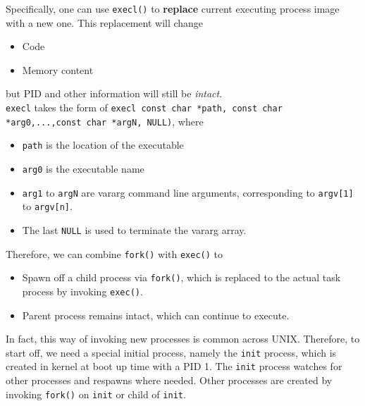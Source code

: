 \documentclass[12pt]{article}
\theoremstyle{definition}
\begin{document}
Specifically, one can use \texttt{execl()} to \textbf{replace} current executing process image with a new one. This replacement will change 
\begin{itemize}
  \item Code
  \item Memory content
\end{itemize}
but PID and other information will still be \textit{intact}.\\
\texttt{execl} takes the form of \texttt{execl const char *path, const char *arg0,...,const char *argN, NULL)}, where
\begin{itemize}
  \item \texttt{path} is the location of the executable
  \item \texttt{arg0} is the executable name
  \item \texttt{arg1} to \texttt{argN} are vararg command line arguments, corresponding to \texttt{argv[1]} to \texttt{argv[n]}.
  \item The last \texttt{NULL} is used to terminate the vararg array.
\end{itemize}
Therefore, we can combine \texttt{fork()} with \texttt{exec()} to
\begin{itemize}
  \item Spawn off a child process via \texttt{fork()}, which is replaced to the actual task process by invoking \texttt{exec()}.
  \item Parent process remains intact, which can continue to execute.
\end{itemize}
In fact, this way of invoking new processes is common across UNIX. Therefore, to start off, we need a special initial process, namely the \texttt{init} process, which is created in kernel at boot up time with a PID 1. The \texttt{init} process watches for other processes and respawns where needed. Other processes are created by invoking \texttt{fork()} on \texttt{init} or child of \texttt{init}. 
\end{document}
